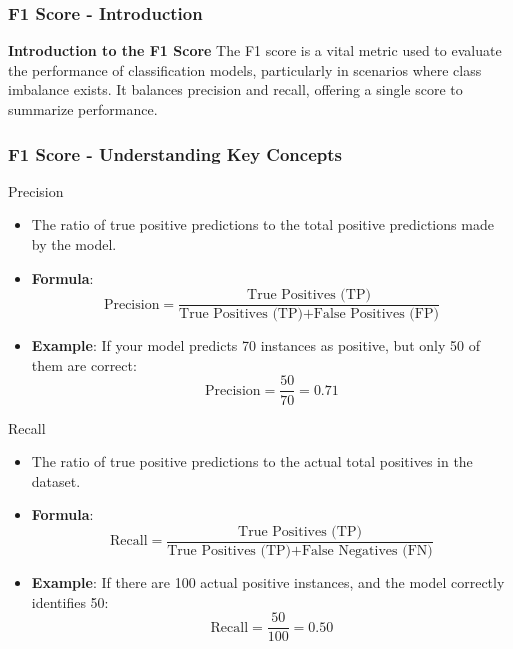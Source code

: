 \documentclass{beamer}
\begin{document}
\begin{frame}[fragile]
    \frametitle{F1 Score - Introduction}
    \textbf{Introduction to the F1 Score}  
    The F1 score is a vital metric used to evaluate the performance of classification models, particularly in scenarios where class imbalance exists. It balances precision and recall, offering a single score to summarize performance.
\end{frame}

\begin{frame}[fragile]
    \frametitle{F1 Score - Understanding Key Concepts}
    \begin{block}{Precision}
        \begin{itemize}
            \item The ratio of true positive predictions to the total positive predictions made by the model.
            \item \textbf{Formula}:
            \begin{equation}
                \text{Precision} = \frac{\text{True Positives (TP)}}{\text{True Positives (TP)} + \text{False Positives (FP)}}
            \end{equation}
            \item \textbf{Example}: If your model predicts 70 instances as positive, but only 50 of them are correct:
            \begin{equation}
                \text{Precision} = \frac{50}{70} = 0.71
            \end{equation}
        \end{itemize}
    \end{block}

    \begin{block}{Recall}
        \begin{itemize}
            \item The ratio of true positive predictions to the actual total positives in the dataset.
            \item \textbf{Formula}:
            \begin{equation}
                \text{Recall} = \frac{\text{True Positives (TP)}}{\text{True Positives (TP)} + \text{False Negatives (FN)}}
            \end{equation}
            \item \textbf{Example}: If there are 100 actual positive instances, and the model correctly identifies 50:
            \begin{equation}
                \text{Recall} = \frac{50}{100} = 0.50
            \end{equation}
        \end{itemize}
    \end{block}
\end{frame}
\end{document}
